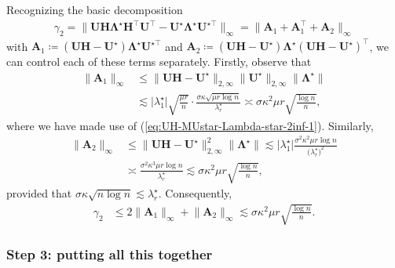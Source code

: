 Recognizing the basic decomposition
%
\begin{align*}
	\gamma_2 = \big\| \bm{U}\bm{H}\bm{\Lambda}^{\star}\bm{H}^{\top}\bm{U}^{\top}-\bm{U}^{\star}\bm{\Lambda}^{\star}\bm{U}^{\star\top} \big\|_{\infty}
	= \big\| \bm{A}_1 + \bm{A}_1^{\top} + \bm{A}_2 \big\|_{\infty}
\end{align*}
%
with $\bm{A}_{1}\coloneqq(\bm{U}\bm{H}-\bm{U}^{\star})\bm{\Lambda}^{\star}\bm{U}^{\star\top}$
and $\bm{A}_{2}\coloneqq(\bm{U}\bm{H}-\bm{U}^{\star})\bm{\Lambda}^{\star}(\bm{U}\bm{H}-\bm{U}^{\star})^{\top}$,
we can control each of these terms separately.
Firstly, observe that
%
\begin{align*}
\big\|\bm{A}_{1}\big\|_{\infty} & \leq\|\bm{U}\bm{H}-\bm{U}^{\star}\|_{2,\infty}\big\|\bm{U}^{\star}\big\|_{2,\infty}\big\|\bm{\Lambda}^{\star}\big\|\\
 & \lesssim\big|\lambda_{1}^{\star}\big|\sqrt{\frac{\mu r}{n}}\cdot\frac{\sigma\kappa\sqrt{\mu r\log n}}{\lambda_{r}^{\star}}\asymp\sigma\kappa^{2}\mu r\sqrt{\frac{\log n}{n}},
\end{align*}
%
where we have made use of (\ref{eq:UH-MUstar-Lambda-star-2inf-1}). Similarly,
%
\begin{align*}
	\big\|\bm{A}_{2}\big\|_{\infty} & \leq\|\bm{U}\bm{H}-\bm{U}^{\star}\|_{2,\infty}^{2}\big\|\bm{\Lambda}^{\star}\big\|
	\lesssim\big|\lambda_{1}^{\star}\big|\frac{\sigma^{2}\kappa^{2}\mu r\log n}{\big(\lambda_{r}^{\star}\big)^{2}}\\
 	& \asymp\frac{\sigma^{2}\kappa^{3}\mu r\log n}{\lambda_{r}^{\star}}\lesssim\sigma\kappa^{2}\mu r\sqrt{\frac{\log n}{n}},
\end{align*}
%
provided that $\sigma\kappa\sqrt{n\log n}\lesssim\lambda_{r}^{\star}$.
Consequently,
%
\begin{align*}
\gamma_2 & \leq2\big\|\bm{A}_{1}\big\|_{\infty}+\big\|\bm{A}_{2}\big\|_{\infty}\lesssim\sigma\kappa^{2}\mu r\sqrt{\frac{\log n}{n}}.
\end{align*}



\subsubsection{Step 3: putting all this together}

